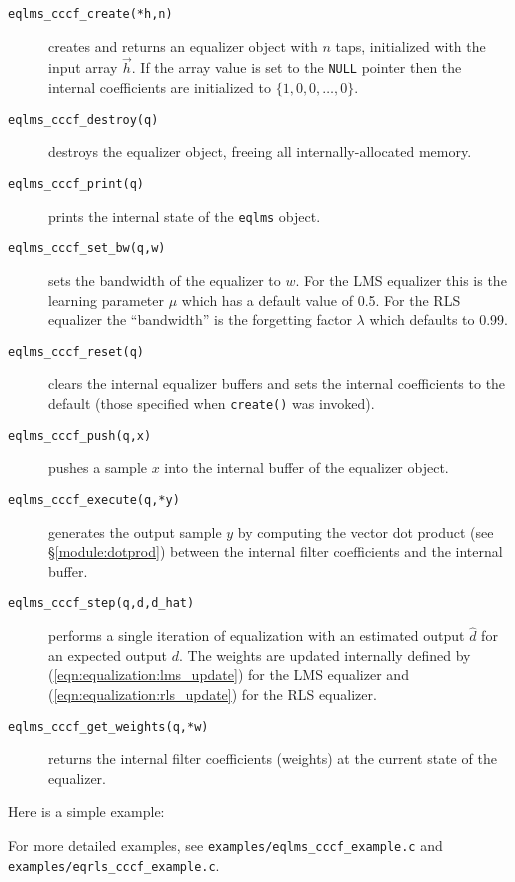 \begin{description}
\item[{\tt eqlms\_cccf\_create(*h,n)}]
    creates and returns an equalizer object with $n$ taps,
    initialized with the input array $\vec{h}$.
    If the array value is set to the {\tt NULL} pointer then the
    internal coefficients are initialized to
    $\{1,0,0,\ldots,0\}$.
\item[{\tt eqlms\_cccf\_destroy(q)}]
    destroys the equalizer object, freeing all internally-allocated
    memory.
\item[{\tt eqlms\_cccf\_print(q)}]
    prints the internal state of the {\tt eqlms} object.
\item[{\tt eqlms\_cccf\_set\_bw(q,w)}]
    sets the bandwidth of the equalizer to $w$.
    For the LMS equalizer this is the learning parameter $\mu$ which has
    a default value of 0.5.
    For the RLS equalizer the ``bandwidth'' is the forgetting factor
    $\lambda$ which defaults to 0.99.
\item[{\tt eqlms\_cccf\_reset(q)}]
    clears the internal equalizer buffers and sets the internal
    coefficients to the default
    (those specified when {\tt create()} was invoked).
\item[{\tt eqlms\_cccf\_push(q,x)}]
    pushes a sample $x$ into the internal buffer of the equalizer
    object.
\item[{\tt eqlms\_cccf\_execute(q,*y)}]
    generates the output sample $y$ by computing the vector dot product
    (see \S\ref{module:dotprod})
    between the internal filter coefficients and the internal buffer.
\item[{\tt eqlms\_cccf\_step(q,d,d\_hat)}]
    performs a single iteration of equalization with an estimated output
    $\hat{d}$ for an expected output $d$.
    The weights are updated internally defined by
    (\ref{eqn:equalization:lms_update}) for the LMS equalizer and
    (\ref{eqn:equalization:rls_update}) for the RLS equalizer.
\item[{\tt eqlms\_cccf\_get\_weights(q,*w)}]
    returns the internal filter coefficients (weights) at the current
    state of the equalizer.
\end{description}
%
Here is a simple example:
%

%
For more detailed examples, see
{\tt examples/eqlms\_cccf\_example.c} and
{\tt examples/eqrls\_cccf\_example.c}.


